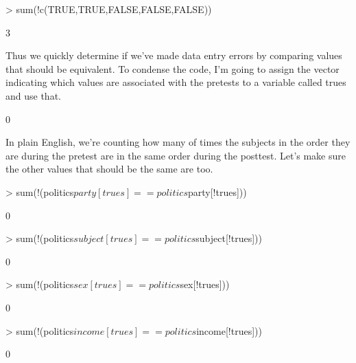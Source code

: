 \documentclass[12pt]{article}
\begin{document}
\begin{Schunk}
\begin{Sinput}
> sum(!c(TRUE,TRUE,FALSE,FALSE,FALSE))
\end{Sinput}
\begin{Soutput}
[1] 3
\end{Soutput}
\end{Schunk}

Thus we quickly determine if we've made data entry errors by comparing values
that should be equivalent. To condense the code, I'm going to assign the vector
indicating which values are associated with the pretests to a variable called
trues and use that.

\begin{Schunk}
\begin{Soutput}
[1] 0
\end{Soutput}
\end{Schunk}

In plain English, we're counting how many of times the subjects in the order
they are during the pretest are in the same order during the posttest. Let's
make sure the other values that should be the same are too.

\begin{Schunk}
\begin{Sinput}
> sum(!(politics$party[trues]==politics$party[!trues]))
\end{Sinput}
\begin{Soutput}
[1] 0
\end{Soutput}
\begin{Sinput}
> sum(!(politics$subject[trues]==politics$subject[!trues]))
\end{Sinput}
\begin{Soutput}
[1] 0
\end{Soutput}
\begin{Sinput}
> sum(!(politics$sex[trues]==politics$sex[!trues]))
\end{Sinput}
\begin{Soutput}
[1] 0
\end{Soutput}
\begin{Sinput}
> sum(!(politics$income[trues]==politics$income[!trues]))
\end{Sinput}
\begin{Soutput}
[1] 0
\end{Soutput}
\end{Schunk}
\end{document}

